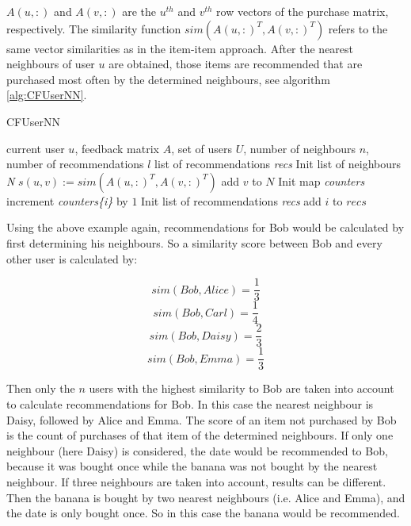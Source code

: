 \documentclass[10pt]{reportMaster}
\begin{document}
$A(u,:)$ and $A(v,:)$ are the $u^{th}$ and $v^{th}$ row vectors of the purchase matrix, respectively.
The similarity function $sim(A(u,:)^T, A(v, :)^T)$ refers to the same vector similarities as in the item-item approach.
After the nearest neighbours of user $u$ are obtained, those items are recommended that are purchased most often by the determined neighbours, see algorithm \ref{alg:CFUserNN}.

\begin{algorithm}
	\caption[CFUserNN]{CFUserNN}
	\label{alg:CFUserNN}
	\begin{algorithmic}[1]
		\Require current user $u$, feedback matrix $A$, set of users $U$, number of neighbours $n$, number of recommendations $l$
		\Ensure list of recommendations \textit{recs}
		\State Init list of neighbours \textit{N}
			\State $s(u,v) := sim(A(u,:)^T, A(v,:)^T)$
				\State add $v$ to $N$
			\EndIf
		\EndFor
		\State Init map \textit{counters}
				\State increment \textit{counters\{i\}} by $1$
			\EndFor
		\EndFor
		\State Init list of recommendations \textit{recs}
			\State add $i$ to $recs$
			\EndIf
		\EndFor
	\end{algorithmic}	
\end{algorithm}

Using the above example again, recommendations for Bob would be calculated by first determining his neighbours.
So a similarity score between Bob and every other user is calculated by: 

$$sim(Bob, Alice) = \frac{1}{3}$$
$$sim(Bob, Carl) = \frac{1}{4}$$
$$sim(Bob, Daisy) = \frac{2}{3}$$
$$sim(Bob, Emma) = \frac{1}{3}$$

Then only the $n$ users with the highest similarity to Bob are taken into account to calculate recommendations for Bob.
In this case the nearest neighbour is Daisy, followed by Alice and Emma.
The score of an item not purchased by Bob is the count of purchases of that item of the determined neighbours.
If only one neighbour (here Daisy) is considered, the date would be recommended to Bob, because it was bought once while the banana was not bought by the nearest neighbour.
If three neighbours are taken into account, results can be different.
Then the banana is bought by two nearest neighbours (i.e. Alice and Emma), and the date is only bought once.
So in this case the banana would be recommended.
\end{document}
